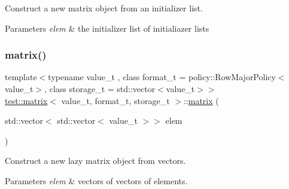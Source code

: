 Construct a new matrix object from an initializer list. 


\begin{DoxyParams}{Parameters}
{\em elem} & the initializer list of initialiazer lists \\
\hline
\end{DoxyParams}
\mbox{\label{classtest_1_1matrix_abf4537692c748dbec4ffdcc616e83592}} 
\subsubsection{\texorpdfstring{matrix()}{matrix()}\hspace{0.1cm}{\footnotesize\ttfamily [3/5]}}
{\footnotesize\ttfamily template$<$typename value\+\_\+t , class format\+\_\+t  = policy\+::\+Row\+Major\+Policy$<$value\+\_\+t$>$, class storage\+\_\+t  = std\+::vector$<$value\+\_\+t$>$$>$ \\
\mbox{\hyperlink{classtest_1_1matrix}{test\+::matrix}}$<$ value\+\_\+t, format\+\_\+t, storage\+\_\+t $>$\+::\mbox{\hyperlink{classtest_1_1matrix}{matrix}} (\begin{DoxyParamCaption}\item[{std\+::vector$<$ std\+::vector$<$ value\+\_\+t $>$$>$}]{elem }\end{DoxyParamCaption})\hspace{0.3cm}{\ttfamily [inline]}}



Construct a new lazy matrix object from vectors. 


\begin{DoxyParams}{Parameters}
{\em elem} & vectors of vectors of elements. \\
\hline
\end{DoxyParams}
\mbox{\label{classtest_1_1matrix_a8ff0fb4c772493b77b89ad49e09673ea}} 
